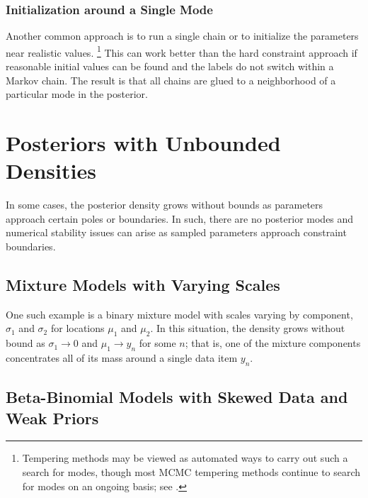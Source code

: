 \subsubsection{Initialization around a Single Mode}

Another common approach is to run a single chain or to initialize the
parameters near realistic values.%
%
\footnote{Tempering methods may be viewed as automated ways to carry
  out such a search for modes, though most MCMC tempering methods
  continue to search for modes on an ongoing basis; see
  \citep{SwendsenWang:1986, Neal:1996b}.}
%
This can work better than the hard constraint approach if reasonable
initial values can be found and the labels do not switch within a
Markov chain.  The result is that all chains are glued to a
neighborhood of a particular mode in the posterior.



\section{Posteriors with Unbounded Densities}

In some cases, the posterior density grows without bounds as
parameters approach certain poles or boundaries.  In such, there
are no posterior modes and numerical stability issues can arise as
sampled parameters approach constraint boundaries.

\subsection{Mixture Models with Varying Scales}

One such example is a binary mixture model with scales varying by
component, $\sigma_1$ and $\sigma_2$ for locations $\mu_1$ and
$\mu_2$. In this situation, the density grows without bound as
$\sigma_1 \rightarrow 0$ and $\mu_1 \rightarrow y_n$ for some $n$;
that is, one of the mixture components concentrates all of its mass
around a single data item $y_n$.

\subsection{Beta-Binomial Models with Skewed Data and Weak Priors}

